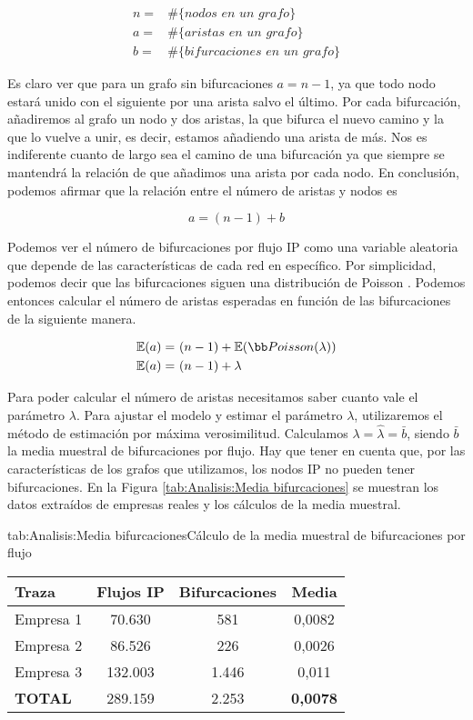 \documentclass[tfg,epsbased,lof,lot,loa,covers,final,copyright,overleaf]{tfgtfmthesisuam}
\begin{document}
\begin{align*}
	n =& \mathbin{\#}\{\textit{nodos en un grafo}\} \\
	a =& \mathbin{\#}\{\textit{aristas en un grafo}\} \\
	b =& \mathbin{\#}\{\textit{bifurcaciones en un grafo}\}
\end{align*}

Es claro ver que para un grafo sin bifurcaciones $a = n-1$, ya que todo nodo estará unido con el siguiente por una arista salvo el último. Por cada bifurcación, añadiremos al grafo un nodo y dos aristas, la que bifurca el nuevo camino y la que lo vuelve a unir, es decir, estamos añadiendo una arista de más. Nos es indiferente cuanto de largo sea el camino de una bifurcación ya que siempre se mantendrá la relación de que añadimos una arista por cada nodo. En conclusión, podemos afirmar que la relación entre el número de aristas y nodos es

$$a = (n - 1) + b$$

Podemos ver el número de bifurcaciones por flujo IP como una variable aleatoria que depende de las características de cada red en específico. Por simplicidad, podemos decir que las bifurcaciones siguen una distribución de Poisson \cite{Spiegel}. Podemos entonces calcular el número de aristas esperadas en función de las bifurcaciones de la siguiente manera.

\begin{align*}
    \mathbb{E}(a) =&\ (n - 1) + \mathbb{E}(\bb Poisson(\lambda))\\
    \mathbb{E}(a) =&\ (n - 1) + \lambda \
\end{align*}

Para poder calcular el número de aristas necesitamos saber cuanto vale el parámetro $\lambda$. Para ajustar el modelo y estimar el parámetro $\lambda$, utilizaremos el método de estimación por máxima verosimilitud. Calculamos $\lambda = \widehat{\lambda} = \bar{b}$, siendo $\bar{b}$ la media muestral de bifurcaciones por flujo. Hay que tener en cuenta que, por las características de los grafos que utilizamos, los nodos IP no pueden tener bifurcaciones. En la Figura \ref{tab:Analisis:Media bifurcaciones} se muestran los datos extraídos de empresas reales y los cálculos de la media muestral.

\begin{table}{tab:Analisis:Media bifurcaciones}{Cálculo de la media muestral de bifurcaciones por flujo}
	\begin{tabular}{lccc}
		\toprule \textbf{Traza} & \textbf{Flujos IP}  & \textbf{Bifurcaciones} & \textbf{Media} \\ 
		\midrule
		Empresa 1 & 70.630 & 581 & 0,0082 \\
		Empresa 2 & 86.526 & 226 & 0,0026 \\
		Empresa 3 & 132.003 & 1.446 & 0,011 \\
		\textbf{TOTAL} & 289.159 & 2.253 & \textbf{0,0078} \\
		\bottomrule
	\end{tabular}
\end{table}
\end{document}
